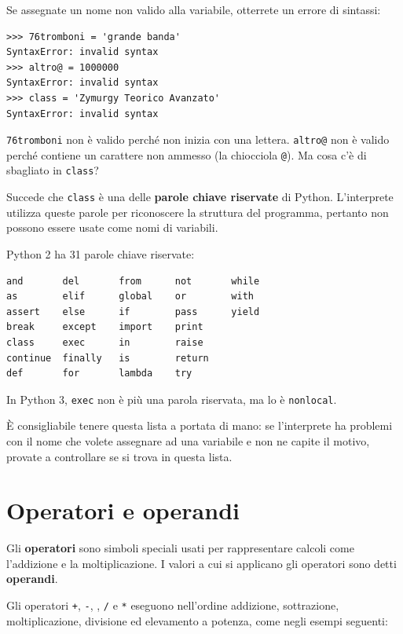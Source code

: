 \documentclass[10pt]{book}
\begin{document}
Se assegnate un nome non valido alla variabile, otterrete un errore di sintassi:

\begin{verbatim}
>>> 76tromboni = 'grande banda'
SyntaxError: invalid syntax
>>> altro@ = 1000000
SyntaxError: invalid syntax
>>> class = 'Zymurgy Teorico Avanzato'
SyntaxError: invalid syntax
\end{verbatim}
%
{\tt 76tromboni} non è valido perché non inizia con una lettera.
{\tt altro@} non è valido perché contiene un carattere non ammesso (la chiocciola {\tt @}). Ma cosa c'è di sbagliato in {\tt class}?

Succede che {\tt class} è una delle {\bf parole chiave riservate} di Python. L'interprete utilizza queste parole per riconoscere la struttura del programma, pertanto non possono essere usate come nomi di variabili.

Python 2 ha 31 parole chiave riservate:

\begin{verbatim}
and       del       from      not       while    
as        elif      global    or        with     
assert    else      if        pass      yield    
break     except    import    print              
class     exec      in        raise              
continue  finally   is        return             
def       for       lambda    try
\end{verbatim}
%
In Python 3, {\tt exec} non è più una parola riservata, ma lo è {\tt nonlocal}.

È consigliabile tenere questa lista a portata di mano: se l'interprete ha problemi con il nome che volete assegnare ad una variabile e non ne capite il motivo, provate a controllare se si trova in questa lista.


\section{Operatori e operandi}

Gli {\bf operatori} sono simboli speciali usati per rappresentare calcoli come l'addizione e la moltiplicazione. I valori a cui si applicano gli operatori sono detti {\bf operandi}.

Gli operatori {\tt +}, {\tt -}, {\tt *}, {\tt /} e {\tt **}
eseguono nell'ordine addizione, sottrazione, moltiplicazione, divisione ed elevamento a potenza, come negli esempi seguenti:
\end{document}
